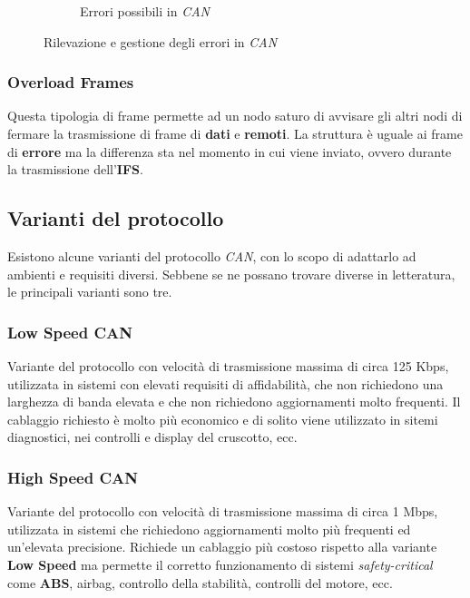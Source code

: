 \begin{figure}[h]
\begin{subfigure}{0.45\textwidth}
        \caption{Errori possibili in \emph{CAN}}
        \label{fig:can-error-types}
    \end{subfigure}
    \caption{Rilevazione e gestione degli errori in \emph{CAN}}
    \label{fig:can-error}
\end{figure}


\subsubsection{Overload Frames}
Questa tipologia di frame permette ad un nodo saturo di avvisare gli altri nodi di fermare la trasmissione di frame di \textbf{dati} e \textbf{remoti}. La struttura è uguale ai frame di \textbf{errore} ma la differenza sta nel momento in cui viene inviato, ovvero durante la trasmissione dell'\textbf{IFS}. \cite{wikipedia_canbus}

\subsection{Varianti del protocollo}
Esistono alcune varianti del protocollo \emph{CAN}, con lo scopo di adattarlo ad ambienti e requisiti diversi. Sebbene se ne possano trovare diverse in letteratura, le principali varianti sono tre.

\subsubsection{Low Speed CAN}
Variante del protocollo con velocità di trasmissione massima di circa 125 Kbps, utilizzata in sistemi con elevati requisiti di affidabilità, che non richiedono una larghezza di banda elevata e che non richiedono aggiornamenti molto frequenti. Il cablaggio richiesto è molto più economico e di solito viene utilizzato in sitemi diagnostici, nei controlli e display del cruscotto, ecc. \cite{can_bus_dewesoft}

\subsubsection{High Speed CAN}
Variante del protocollo con velocità di trasmissione massima di circa 1 Mbps, utilizzata in sistemi che richiedono aggiornamenti molto più frequenti ed un'elevata precisione. Richiede un cablaggio più costoso rispetto alla variante \textbf{Low Speed} ma permette il corretto funzionamento di sistemi \emph{safety-critical} come \textbf{ABS}, airbag, controllo della stabilità, controlli del motore, ecc. \cite{can_bus_dewesoft}

